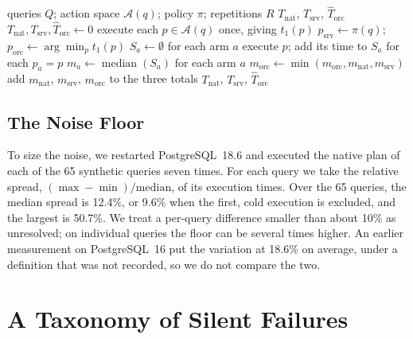 \documentclass[conference]{IEEEtran}
\begin{document}
\begin{algorithm}[t]
\caption{Paired Timing With an Oracle Estimate}
\label{alg:paired}
\small
\begin{algorithmic}[1]
\Require queries $Q$; action space $\mathcal{A}(q)$; policy $\pi$;
  repetitions $R$
\Ensure $T_{\mathrm{nat}}$, $T_{\mathrm{srv}}$, $\widehat{T}_{\mathrm{orc}}$
\State $T_{\mathrm{nat}}, T_{\mathrm{srv}}, \widehat{T}_{\mathrm{orc}} \gets 0$
  \State execute each $p \in \mathcal{A}(q)$ once, giving $t_1(p)$
  \State $p_{\mathrm{srv}} \gets \pi(q)$;\quad
    $p_{\mathrm{orc}} \gets \arg\min_{p} t_1(p)$
  \State $S_a \gets \emptyset$ for each arm $a$
      \State execute $p$; add its time to $S_a$ for each $p_a = p$
    \EndFor
  \EndFor
  \State $m_a \gets \operatorname{median}(S_a)$ for each arm $a$
  \State $m_{\mathrm{orc}} \gets \min(m_{\mathrm{orc}}, m_{\mathrm{nat}},
    m_{\mathrm{srv}})$
  \State add $m_{\mathrm{nat}}$, $m_{\mathrm{srv}}$, $m_{\mathrm{orc}}$ to the
    three totals
\EndFor
\State \Return $T_{\mathrm{nat}}$, $T_{\mathrm{srv}}$, $\widehat{T}_{\mathrm{orc}}$
\end{algorithmic}
\end{algorithm}

\subsection{The Noise Floor}
\label{sec:noise}

To size the noise, we restarted PostgreSQL~18.6 and executed the native plan of
each of the 65 synthetic queries seven times. For each query we take the
relative spread, $(\max - \min)/\mathrm{median}$, of its execution times. Over
the 65 queries, the median spread is 12.4\%, or 9.6\% when the first, cold
execution is excluded, and the largest is 50.7\%. We treat a per-query
difference smaller than about 10\% as unresolved; on individual queries the
floor can be several times higher. An earlier measurement on PostgreSQL~16 put
the variation at 18.6\% on average, under a definition that was not recorded,
so we do not compare the two.

\section{A Taxonomy of Silent Failures}
\label{sec:failures}
\end{document}
